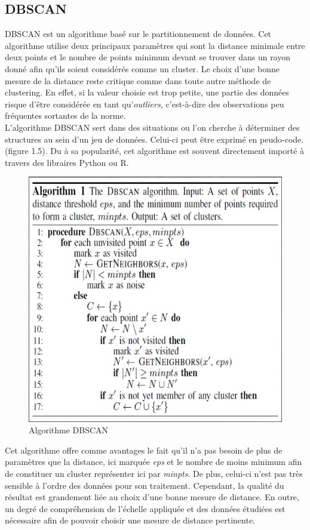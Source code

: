 \documentclass[memoire.tex]{subfiles}
\begin{document}
\newpage
\subsection{DBSCAN}
DBSCAN est un algorithme basé sur le partitionnement de données. Cet algorithme utilise deux principaux paramètres qui sont la distance minimale entre deux points et le nombre de points minimum devant se trouver dans un rayon donné afin qu'ils soient considérés comme un cluster\cite{ref12}. Le choix d'une bonne mesure de la distance reste critique comme dans toute autre méthode de clustering. En effet, si la valeur choisie est trop petite, une partie des données risque d'être considérée en tant qu'\textit {outliers,} c'est-à-dire des observations peu fréquentes sortantes de la norme.\\
L'algorithme DBSCAN sert dans des situations ou l'on cherche à déterminer des structures au sein d'un jeu de données. Celui-ci peut être exprimé en peudo-code.(figure 1.5). Du à sa popularité, cet algorithme est souvent directement importé à travers des libraires Python ou R.
	\begin{figure}[h!]
		\centerline{\includegraphics[scale=0.5]{img/dbscan.png}}
		\caption{Algorithme DBSCAN}
	\end{figure}
Cet algorithme offre comme avantages le fait qu'il n'a pas besoin de plus de paramètres que la distance, ici marquée \textit{eps} et le nombre de moins minimum afin de constituer un cluster représenter ici par \textit{minpts}. De plus, celui-ci n'est pas très sensible à l'ordre des données pour son traitement. Cependant, la qualité du résultat est grandement liée au choix d'une bonne mesure de distance. En outre, un degré de compréhension de l'échelle appliquée et des données étudiées est nécessaire afin de pouvoir choisir une mesure de distance pertinente.\\
\end{document}
